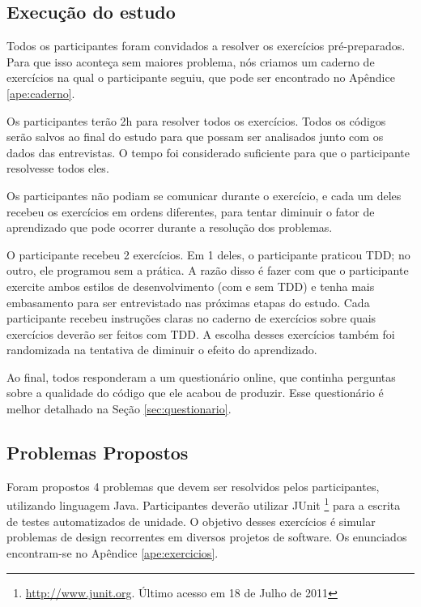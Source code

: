 \subsection{Execução do estudo}
\label{sec:execucao}	

Todos os participantes foram convidados a resolver os exercícios pré-preparados. 
Para que isso aconteça sem maiores problema, nós criamos um caderno
de exercícios na qual o participante seguiu, que pode ser encontrado
no Apêndice \ref{ape:caderno}.

Os participantes terão 2h para resolver todos os exercícios. 
Todos os códigos serão salvos ao final do estudo para que possam ser analisados junto
com os dados das entrevistas.
O tempo foi considerado suficiente para que o participante resolvesse todos eles. 

Os participantes não podiam se comunicar durante o exercício, e cada um deles recebeu
os exercícios em ordens diferentes, para tentar diminuir o fator de aprendizado que 
pode ocorrer durante a resolução dos problemas. 

O participante recebeu 2 exercícios. Em 1 deles, o participante praticou TDD; no outro,
ele programou sem a prática. A razão disso
é fazer com que o participante exercite ambos estilos de desenvolvimento (com e sem TDD)
e tenha mais embasamento para ser entrevistado nas próximas etapas do estudo. 
Cada participante recebeu instruções claras no caderno de exercícios 
sobre quais exercícios deverão ser feitos
com TDD. A escolha desses exercícios também foi randomizada na tentativa de diminuir
o efeito do aprendizado.

Ao final, todos responderam a um questionário online, 
que continha perguntas sobre a qualidade
do código que ele acabou de produzir. Esse questionário
é melhor detalhado na Seção \ref{sec:questionario}.

\subsection{Problemas Propostos}
\label{sec:exercicios}

Foram propostos 4 problemas que devem ser resolvidos pelos participantes, utilizando
linguagem Java. Participantes deverão utilizar JUnit \footnote{\url{http://www.junit.org}. 
Último acesso em 18 de Julho de 2011} para a escrita de testes
automatizados de unidade. O objetivo desses exercícios é simular problemas de design 
recorrentes em diversos projetos de software. Os enunciados encontram-se no Apêndice 
\ref{ape:exercicios}.

